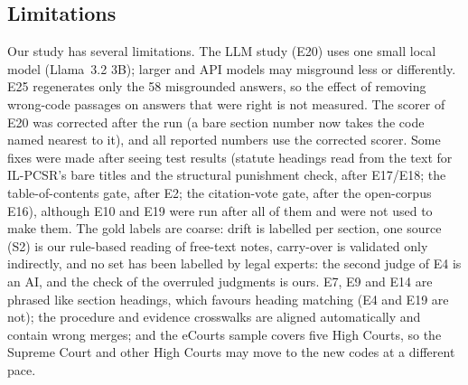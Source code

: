 \documentclass[sigconf,nonacm]{acmart}
\begin{document}
\subsection{Limitations}\label{sec:limits}
Our study has several limitations. The LLM study (E20) uses one small local model (Llama~3.2 3B);
larger and API models may misground less or differently. E25 regenerates only the 58 misgrounded
answers, so the effect of removing wrong-code passages on answers that were right is not measured. The scorer of E20 was corrected after
the run (a bare section number now takes the code named nearest to it), and all reported numbers
use the corrected scorer. Some fixes were made after seeing test
results (statute headings read from the text for IL-PCSR's bare titles and the structural
punishment check, after E17/E18; the table-of-contents gate, after E2; the citation-vote gate,
after the open-corpus E16), although E10 and E19 were run after all of them and were not used to
make them. The gold labels are coarse: drift is labelled per section, one source (S2) is our
rule-based reading of free-text notes, carry-over is validated only indirectly, and no set has been labelled by legal experts: the
second judge of E4 is an AI, and the check of the overruled judgments is ours. E7, E9 and E14 are phrased like section
headings, which favours heading matching (E4 and E19 are not); the procedure and evidence
crosswalks are aligned automatically and contain wrong merges; and the eCourts sample covers five
High Courts, so the Supreme Court and other High Courts may move to the new codes at a different
pace.
\end{document}
